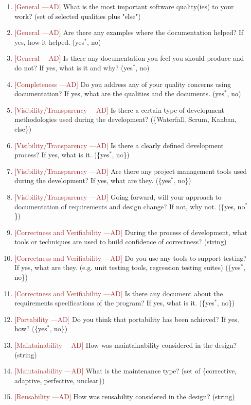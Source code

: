 \documentclass[letterpaper,cleveref]{lipics-v2019}
\newcommand{\authornote}[3]{\textcolor{#1}{[#3 ---#2]}}
\newcommand{\authornote}[3]{}
\newcommand{\ad}[1]{\authornote{brown}{AD}{#1}} %
\theoremstyle{definition}
\begin{document}
\begin{enumerate}
\item \ad{General} What is the most important software quality(ies) to your
  work? (set of selected qualities plus "else")
\item \ad{General} Are there any examples where the documentation helped? If
  yes, how it helped. ({yes$^*$, no})
\item \ad{General} Is there any documentation you feel you should produce and do
  not? If yes, what is it and why? ({yes$^*$, no})
\item \ad{Completeness} Do you address any of your quality concerns using
  documentation? If yes, what are the qualities and the documents. ({yes$^*$,
    no})
\item \ad{Visibility/Transparency} Is there a certain type of development
  methodologies used during the development? (\{Waterfall, Scrum, Kanban,
  else\})
\item \ad{Visibility/Transparency} Is there a clearly defined development
  process? If yes, what is it. (\{yes$^*$, no\})
\item \ad{Visibility/Transparency} Are there any project management tools used
  during the development? If yes, what are they. (\{yes$^*$, no\})
\item \ad{Visibility/Transparency} Going forward, will your approach to
  documentation of requirements and design change? If not, why not. (\{yes,
  no$^*$\})
\item \ad{Correctness and Verifiability} During the process of development, what
  tools or techniques are used to build confidence of correctness? (string)
\item \ad{Correctness and Verifiability} Do you use any tools to support
  testing? If yes, what are they. (e.g. unit testing tools, regression testing
  suites) (\{yes$^*$, no\})
\item \ad{Correctness and Verifiability} Is there any document about the
  requirements specifications of the program? If yes, what is it. (\{yes$^*$,
  no\})
\item \ad{Portability} Do you think that portability has been achieved? If yes,
  how? (\{yes$^*$, no\})
\item \ad{Maintainability} How was maintainability considered in the design?
  (string)
\item \ad{Maintainability} What is the maintenance type? (set of \{corrective,
  adaptive, perfective, unclear\})
\item \ad{Reusability} How was reusability considered in the design? (string)

\end{enumerate}
\end{document}
